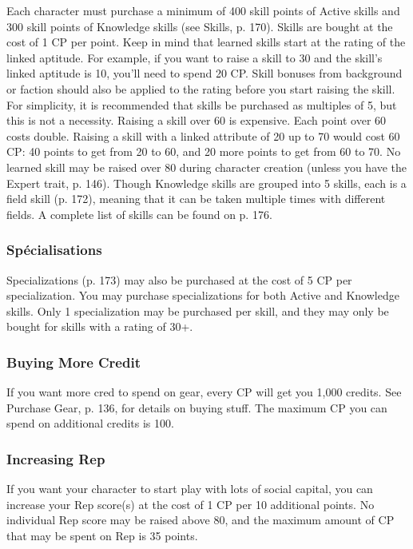 Each character must purchase a minimum of 400 skill points of Active skills and 300 skill points of Knowledge skills (see Skills, p. 170). Skills are bought at the cost of 1 CP per point. Keep in mind that learned skills start at the rating of the linked aptitude. For example, if you want to raise a skill to 30 and the skill’s linked aptitude is 10, you’ll need to spend 20 CP. Skill bonuses from background or faction should also be applied to the rating before you start raising the skill. For simplicity, it is recommended that skills be purchased as multiples of 5, but this is not a necessity. Raising a skill over 60 is expensive. Each point over 60 costs double. Raising a skill with a linked attribute of 20 up to 70 would cost 60 CP: 40 points to get from 20 to 60, and 20 more points to get from 60 to 70. No learned skill may be raised over 80 during character creation (unless you have the Expert trait, p. 146). Though Knowledge skills are grouped into 5 skills, each is a field skill (p. 172), meaning that it can be taken multiple times with different fields. A complete list of skills can be found on p. 176. 

\subsubsection{Spécialisations} \label{sec:buying-specializations} 

Specializations (p. 173) may also be purchased at the cost of 5 CP per specialization. You may purchase specializations for both Active and Knowledge skills. Only 1 specialization may be purchased per skill, and they may only be bought for skills with a rating of 30+. 

\subsubsection{Buying More Credit} \label{sec:buying-credit} 

If you want more cred to spend on gear, every CP will get you 1,000 credits. See Purchase Gear, p. 136, for details on buying stuff. The maximum CP you can spend on additional credits is 100. 

\subsubsection{Increasing Rep} \label{sec:increasing-rep} 

If you want your character to start play with lots of social capital, you can increase your Rep score(s) at the cost of 1 CP per 10 additional points. No individual Rep score may be raised above 80, and the maximum amount of CP that may be spent on Rep is 35 points. 


